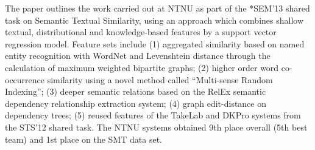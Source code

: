 The paper outlines the work carried out at NTNU as part of the *SEM'13 shared task on Semantic Textual Similarity, using an approach which combines shallow
 textual, distributional and knowledge-based features by a support vector
 regression model. Feature sets include 
 (1) aggregated similarity based on named entity recognition with WordNet and
 Levenshtein distance through the calculation of maximum weighted bipartite
 graphs; 
 (2) higher order word co-occurrence similarity using a novel method called 
 ``Multi-sense Random Indexing''; 
 (3) deeper semantic relations based on the RelEx semantic dependency
 relationship extraction system; 
 (4) graph edit-distance on dependency trees; 
 (5) reused features of the TakeLab and DKPro systems from the STS'12 shared
 task. 
 The NTNU systems obtained 9th place overall (5th best team) and 1st place on
 the SMT data set.

